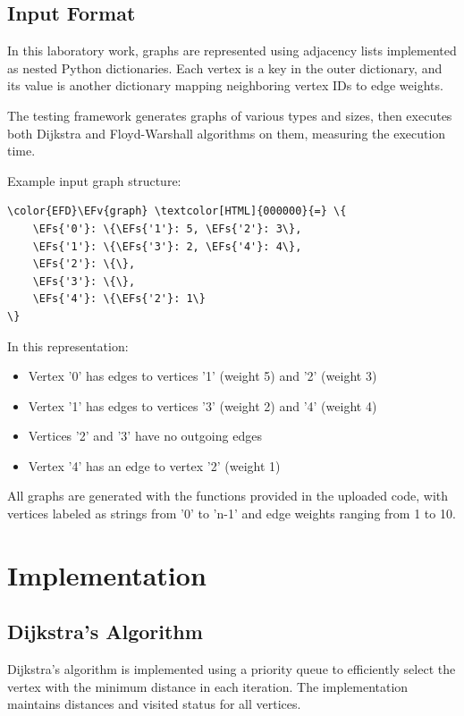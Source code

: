 \documentclass[a4paper,12pt]{article}
\newcommand{\EFs}[1]{\textcolor{EFs}{#1}} %
\newcommand{\EFv}[1]{\textcolor{EFv}{#1}} %
\begin{document}
\subsection{Input Format}
\label{sec:orge37991f}
In this laboratory work, graphs are represented using adjacency lists implemented as nested Python dictionaries. Each vertex is a key in the outer dictionary, and its value is another dictionary mapping neighboring vertex IDs to edge weights.

The testing framework generates graphs of various types and sizes, then executes both Dijkstra and Floyd-Warshall algorithms on them, measuring the execution time.

Example input graph structure:
\begin{Code}
\begin{Verbatim}
\color{EFD}\EFv{graph} \textcolor[HTML]{000000}{=} \{
    \EFs{'0'}: \{\EFs{'1'}: 5, \EFs{'2'}: 3\},
    \EFs{'1'}: \{\EFs{'3'}: 2, \EFs{'4'}: 4\},
    \EFs{'2'}: \{\},
    \EFs{'3'}: \{\},
    \EFs{'4'}: \{\EFs{'2'}: 1\}
\}
\end{Verbatim}
\end{Code}

In this representation:
\begin{itemize}
\item Vertex '0' has edges to vertices '1' (weight 5) and '2' (weight 3)
\item Vertex '1' has edges to vertices '3' (weight 2) and '4' (weight 4)
\item Vertices '2' and '3' have no outgoing edges
\item Vertex '4' has an edge to vertex '2' (weight 1)
\end{itemize}

All graphs are generated with the functions provided in the uploaded code, with vertices labeled as strings from '0' to 'n-1' and edge weights ranging from 1 to 10.
\section{Implementation}
\label{sec:orgcae3f38}
\subsection{Dijkstra's Algorithm}
\label{sec:org531aa72}
Dijkstra's algorithm is implemented using a priority queue to efficiently select the vertex with the minimum distance in each iteration. The implementation maintains distances and visited status for all vertices.
\end{document}
